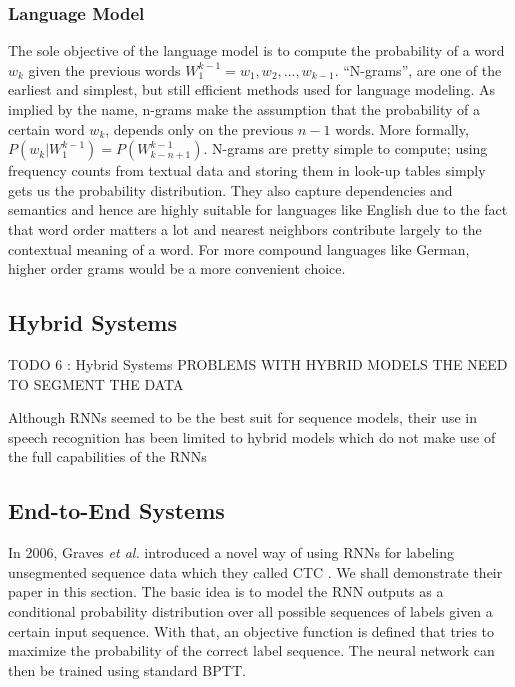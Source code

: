 \subsubsection{Language Model} 
\label{bg:subsub5}

The sole objective of the language model is to compute the probability of a word $w_k$ given the previous words $W_1^{k-1} = w_1,w_2,...,w_{k-1}$. \enquote{N-grams}, are one of the earliest and simplest, but still efficient methods used for language modeling. As implied by the name, n-grams make the assumption that the probability of a certain word $w_k$, depends only on the previous $n-1$ words. More formally, $P(w_k|W_1^{k-1}) = P(W_{k-n+1}^{k-1}) $. N-grams are pretty simple to compute; using frequency counts from textual data and storing them in look-up tables simply gets us the probability distribution. They also capture dependencies and semantics and hence are highly suitable for languages like English due to the fact that word order matters a lot and nearest neighbors contribute largely to the contextual meaning of a word. For more compound languages like German, higher order grams would be a more convenient choice.  


\subsection{Hybrid Systems} 
\label{bg:sub6}
TODO 6 : Hybrid Systems
PROBLEMS WITH HYBRID MODELS
THE NEED TO SEGMENT THE DATA


Although \ac{RNN}s seemed to be the best suit for sequence models, their use in speech recognition has been limited to hybrid models which do not make use of the full capabilities of the \ac{RNN}s




\subsection{End-to-End Systems} 
\label{bg:sub7}


In 2006, Graves \textit{et al.} introduced a novel way of using \ac{RNN}s for labeling unsegmented sequence data which they called \ac{CTC} \cite{graves2006connectionist}. We shall demonstrate their paper in this section. 
The basic idea is to model the \ac{RNN} outputs as a conditional probability distribution over all possible sequences of labels given a certain input sequence. With that, an objective function is defined that tries to maximize the probability of the correct label sequence. The neural network can then be trained using standard \ac{BPTT}.

